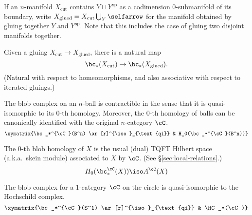 If an $n$-manifold $X_\text{cut}$ contains $Y \sqcup Y^\text{op}$ as a codimension $0$-submanifold of its boundary, write $X_\text{glued} = X_\text{cut} \bigcup_{Y}\selfarrow$ for the manifold obtained by gluing together $Y$ and $Y^\text{op}$. Note that this includes the case of gluing two disjoint manifolds together.
\begin{property}
\label{property:gluing-map}%
Given a gluing $X_\mathrm{cut} \to X_\mathrm{glued}$, there is
a natural map
\[
	\bc_*(X_\mathrm{cut}) \to \bc_*(X_\mathrm{glued}) .
\]
(Natural with respect to homeomorphisms, and also associative with respect to iterated gluings.)
\end{property}

\begin{property}[Contractibility]
\label{property:contractibility}%
The blob complex on an $n$-ball is contractible in the sense that it is quasi-isomorphic to its $0$-th homology. Moreover, the $0$-th homology of balls can be canonically identified with the original $n$-category $\cC$.
\begin{equation}
\xymatrix{\bc_*^{\cC}(B^n) \ar[r]^{\iso}_{\text{qi}} & H_0(\bc_*^{\cC}(B^n))}
\end{equation}
\end{property}

\begin{property}
\label{property:skein-modules}%
The $0$-th blob homology of $X$ is the usual 
(dual) TQFT Hilbert space (a.k.a.\ skein module) associated to $X$
by $\cC$. (See \S \ref{sec:local-relations}.)
\begin{equation*}
H_0(\bc_*^{\cC}(X)) \iso A^{\cC}(X)
\end{equation*}
\end{property}

\begin{property}[Hochschild homology when $X=S^1$]
\label{property:hochschild}%
The blob complex for a $1$-category $\cC$ on the circle is
quasi-isomorphic to the Hochschild complex.
\begin{equation*}
\xymatrix{\bc_*^{\cC}(S^1) \ar[r]^{\iso}_{\text{qi}} & \HC_*(\cC)}
\end{equation*}
\end{property}

